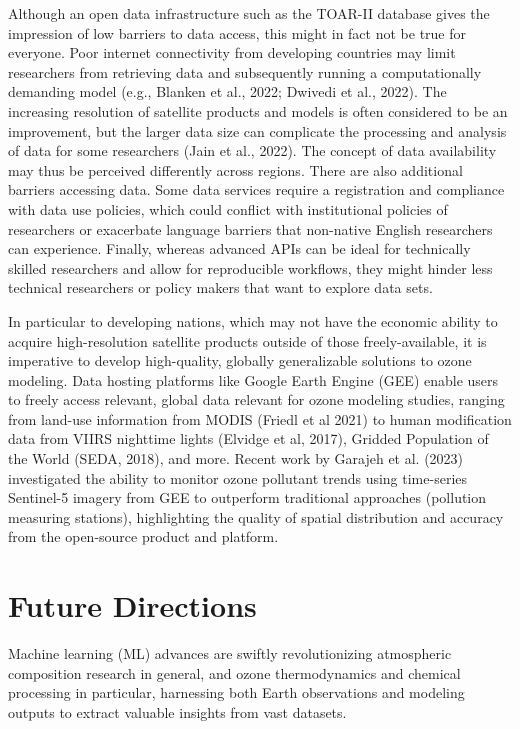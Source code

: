 \documentclass[gmd, manuscript]{copernicus}
\begin{document}
Although an open data infrastructure such as the TOAR-II database gives the impression of low barriers to data access, this might in fact not be true for everyone. Poor internet connectivity from developing countries may limit researchers from retrieving data and subsequently running a computationally demanding model (e.g., Blanken et al., 2022; Dwivedi et al., 2022). The increasing resolution of satellite products and models is often considered to be an improvement, but the larger data size can complicate the processing and analysis of data for some researchers (Jain et al., 2022). The concept of data availability may thus be perceived differently across regions. There are also additional barriers accessing data. Some data services require a registration and compliance with data use policies, which could conflict with institutional policies of researchers or exacerbate language barriers that non-native English researchers can experience. Finally, whereas advanced APIs can be ideal for technically skilled researchers and allow for reproducible workflows, they might hinder less technical researchers or policy makers that want to explore data sets.

In particular to developing nations, which may not have the economic ability to acquire high-resolution satellite products outside of those freely-available, it is imperative to develop high-quality, globally generalizable solutions to ozone modeling. Data hosting platforms like Google Earth Engine (GEE) enable users to freely access relevant, global data relevant for ozone modeling studies, ranging from land-use information from MODIS (Friedl et al 2021) to human modification data from VIIRS nighttime lights (Elvidge et al, 2017), Gridded Population of the World (SEDA, 2018), and more. Recent work by Garajeh et al. (2023) investigated the ability to monitor ozone pollutant trends using time-series Sentinel-5 imagery from GEE to outperform traditional approaches (pollution measuring stations), highlighting the quality of spatial distribution and accuracy from the open-source product and platform.


\section{Future Directions}
Machine learning (ML) advances are swiftly revolutionizing atmospheric composition research in general, and ozone thermodynamics and chemical processing in particular, harnessing both Earth observations and modeling outputs to extract valuable insights from vast datasets.
\end{document}
